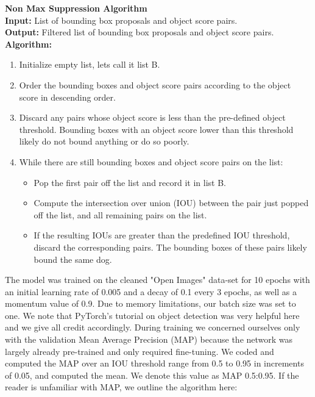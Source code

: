 \documentclass{article}
\begin{document}
\begin{minipage}{1\textwidth}%
	\noindent \textbf{Non Max Suppression Algorithm} \\

  \noindent \textbf{Input:} List of bounding box proposals and object score pairs. \\
  
  \noindent \textbf{Output:} Filtered list of bounding box proposals and object score pairs. \\
  
  \noindent \textbf{Algorithm:} \\
\end{minipage}%

\begin{enumerate}

  \item Initialize empty list, lets call it list B.

  \item Order the bounding boxes and object score pairs according to the object score in descending order.
  
  \item Discard any pairs whose object score is less than the pre-defined object threshold.  Bounding boxes with an object score lower than this threshold likely do not bound anything or do so poorly.
  
  \item While there are still bounding boxes and object score pairs on the list:
        \begin{itemize}
             \item Pop the first pair off the list and record it in list B.            
             \item Compute the intersection over union (IOU) between the pair just popped off the list, and all remaining pairs on the list.
             \item If the resulting IOUs are greater than the predefined IOU threshold, discard the corresponding pairs.  The bounding boxes of these pairs likely bound the same dog.
        \end{itemize}
\end{enumerate}

The model was trained on the cleaned "Open Images" data-set for 10 epochs with an initial learning rate of 0.005 and a decay of 0.1 every 3 epochs, as well as a momentum value of 0.9.  Due to memory limitations, our batch size was set to one.  We note that PyTorch's tutorial on object detection \cite{TorchVision} was very helpful here and we give all credit accordingly.  During training we concerned ourselves only with the validation Mean Average Precision (MAP) because the network was largely already pre-trained and only required fine-tuning.  We coded and computed the MAP over an IOU threshold range from 0.5 to 0.95 in increments of 0.05, and computed the mean.  We denote this value as MAP 0.5:0.95.   If the reader is unfamiliar with MAP, we outline the algorithm here: \\
\end{document}
